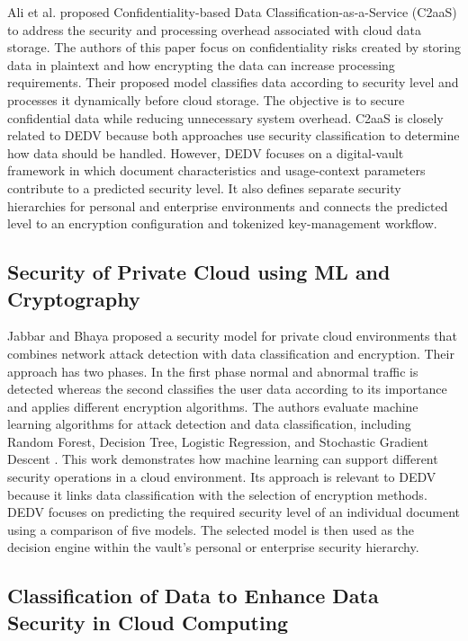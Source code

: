 \documentclass[pdflatex,sn-mathphys-num]{sn-jnl}
\begin{document}
Ali et al. \cite{ali2023confidentiality} proposed Confidentiality-based Data
Classification-as-a-Service (C2aaS) to address the security and processing overhead associated
with cloud data storage. The authors of this paper focus on confidentiality risks created by
storing data in plaintext and how encrypting the data can increase processing requirements. Their
proposed model classifies data according to security level and processes it dynamically before
cloud storage. The objective is to secure confidential data while reducing unnecessary system
overhead. C2aaS is closely related to DEDV because both approaches use security classification to
determine how data should be handled. However, DEDV focuses on a digital-vault framework in which
document characteristics and usage-context parameters contribute to a predicted security level.
It also defines separate security hierarchies for personal and enterprise environments and
connects the predicted level to an encryption configuration and tokenized key-management
workflow.

\subsection{Security of Private Cloud using ML and Cryptography}

Jabbar and Bhaya proposed a security model for private cloud environments that combines network
attack detection with data classification and encryption. Their approach has two phases. In the
first phase normal and abnormal traffic is detected whereas the second classifies the user data
according to its importance and applies different encryption algorithms. The authors evaluate
machine learning algorithms for attack detection and data classification, including Random
Forest, Decision Tree, Logistic Regression, and Stochastic Gradient Descent
\cite{jabbar2022secure}. This work demonstrates how machine learning can support different
security operations in a cloud environment. Its approach is relevant to DEDV because it links data
classification with the selection of encryption methods. DEDV focuses on predicting the required
security level of an individual document using a comparison of five models. The selected model is
then used as the decision engine within the vault's personal or enterprise security hierarchy.

\subsection{Classification of Data to Enhance Data Security in Cloud Computing}
\end{document}
